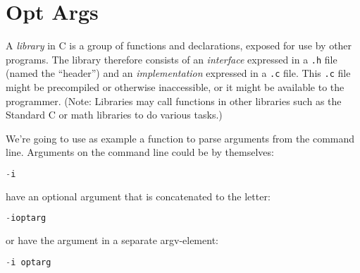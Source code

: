 \section{Opt Args}
A \emph{library} in C is a group of functions and declarations, exposed for use
by other programs. The library therefore consists of an \emph{interface}
expressed in a \texttt{.h} file (named the ``header'') and an
\emph{implementation} expressed in a \texttt{.c} file. This \texttt{.c} file
might be precompiled or otherwise inaccessible, or it might be available to the
programmer. (Note: Libraries may call functions in other libraries such as the
Standard C or math libraries to do various tasks.)

We're going to use as example a function to parse arguments from the command
line. Arguments on the command line could be by themselves:
\lstset{basicstyle=\scriptsize, numbers=left, captionpos=b, tabsize=4}
\begin{lstlisting}[caption=Section \thesection listing \arabic{optcnt},language={C},
breaklines=true,xleftmargin=15pt,label=lst:section\thesection listing\arabic{optcnt}]
-i
\end{lstlisting}

have an optional argument that is concatenated to the letter:
\lstset{basicstyle=\scriptsize, numbers=left, captionpos=b, tabsize=4}
\begin{lstlisting}[caption=Section \thesection listing \arabic{optcnt},language={C},
breaklines=true,xleftmargin=15pt,label=lst:section\thesection listing\arabic{optcnt}]
-ioptarg
\end{lstlisting}

or have the argument in a separate argv-element:
\lstset{basicstyle=\scriptsize, numbers=left, captionpos=b, tabsize=4}
\begin{lstlisting}[caption=Section \thesection listing \arabic{optcnt},language={C},
breaklines=true,xleftmargin=15pt,label=lst:section\thesection listing\arabic{optcnt}]
-i optarg
\end{lstlisting}

